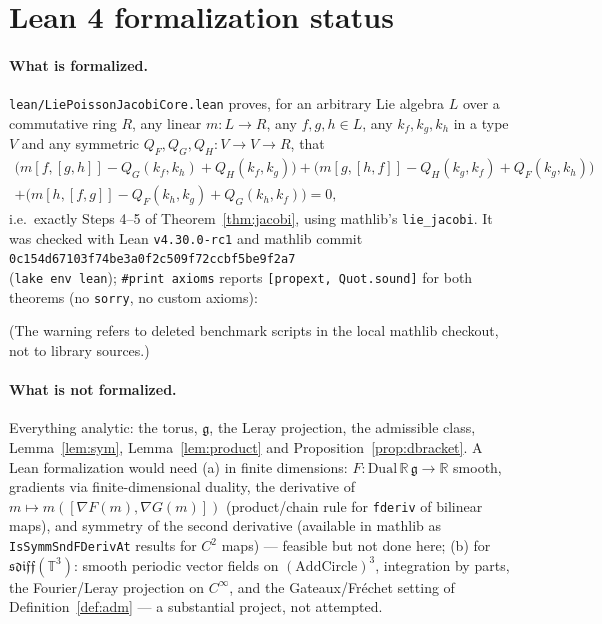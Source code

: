 \documentclass[11pt]{article}
\theoremstyle{definition}
\newcommand{\T}{\mathbb{T}^3}
\newcommand{\R}{\mathbb{R}}
\newcommand{\g}{\mathfrak{g}}
\begin{document}
\section{Lean 4 formalization status}\label{sec:lean}
\paragraph{What is formalized.} \texttt{lean/LiePoissonJacobiCore.lean} proves, for an arbitrary Lie
algebra $L$ over a commutative ring $R$, any linear $m:L\to R$, any $f,g,h\in L$, any $k_f,k_g,k_h$ in a
type $V$ and any symmetric $Q_F,Q_G,Q_H:V\to V\to R$, that
\begin{multline*}
\big(m[f,[g,h]]-Q_G(k_f,k_h)+Q_H(k_f,k_g)\big)+\big(m[g,[h,f]]-Q_H(k_g,k_f)+Q_F(k_g,k_h)\big)\\
+\big(m[h,[f,g]]-Q_F(k_h,k_g)+Q_G(k_h,k_f)\big)=0,
\end{multline*}
i.e.\ exactly Steps 4--5 of Theorem~\ref{thm:jacobi}, using mathlib's \texttt{lie\_jacobi}. It was checked with
Lean \texttt{v4.30.0-rc1} and mathlib commit\\ \texttt{0c154d67103f74be3a0f2c509f72ccbf5be9f2a7}\\
(\texttt{lake env lean}); \texttt{\#print axioms} reports \texttt{[propext, Quot.sound]} for both theorems
(no \texttt{sorry}, no custom axioms):

(The warning refers to deleted benchmark scripts in the local mathlib checkout, not to library sources.)

\paragraph{What is not formalized.} Everything analytic: the torus, $\g$, the Leray projection, the
admissible class, Lemma~\ref{lem:sym}, Lemma~\ref{lem:product} and Proposition~\ref{prop:dbracket}. A Lean
formalization would need (a) in finite dimensions: $F:\mathrm{Dual}\,\R\,\g\to\R$ smooth, gradients via
finite-dimensional duality, the derivative of $m\mapsto m([\nabla F(m),\nabla G(m)])$ (product/chain rule for
\texttt{fderiv} of bilinear maps), and symmetry of the second derivative (available in mathlib as
\texttt{IsSymmSndFDerivAt} results for $C^2$ maps) --- feasible but not done here; (b) for
$\mathfrak{sdiff}(\T)$: smooth periodic vector fields on $(\mathrm{AddCircle})^3$, integration by parts, the
Fourier/Leray projection on $C^\infty$, and the Gateaux/Fréchet setting of Definition~\ref{def:adm} ---
a substantial project, not attempted.
\end{document}
